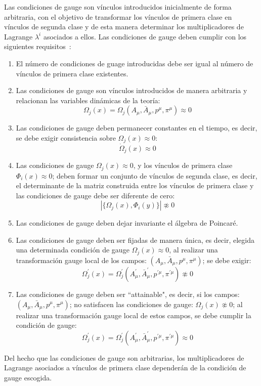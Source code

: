 \documentclass[a4paper,12pt]{article}
\begin{document}
Las condiciones de gauge son vínculos introducidos inicialmente de forma arbitraria, con el objetivo de transformar los vínculos de primera clase en vínculos de segunda clase y de esta manera determinar los multiplicadores de Lagrange $\lambda^i$ asociados a ellos. Las condiciones de gauge deben cumplir con los siguientes \mbox{requisitos \cite{dirac,puebla,Merilin}:}
\begin{enumerate}
\item [\fbox{1.}] El número de condiciones de guage introducidas debe ser igual al número de vínculos de primera clase existentes. 
\item [\fbox{2.}] Las condiciones de gauge son vínculos introducidos de manera arbitraria y relacionan las variables dinámicas de la teoría:
\begin{equation}
\Omega_j(x)=\Omega_j(A_\mu,\bar{A}_\mu,p^\mu,\pi^\mu)\approx0 
\end{equation}
\item [\fbox{3.}] Las condiciones de gauge deben permanecer constantes en el tiempo, es decir, se debe exigir consistencia sobre $\Omega_j(x)\approx0 $:
\begin{equation}
\dot{\Omega}_j(x)\approx0
\end{equation}
\item [\fbox{4.}] Las condiciones de gauge $\Omega_j(x)\approx0 $, y los vínculos de primera \mbox{clase $\Phi_i(x)\approx0$;} deben formar un conjunto de vínculos de segunda clase, es decir, el determinante de la matriz construida entre los vínculos de primera clase y las condiciones de gauge debe ser diferente de cero:
\begin{equation}
|\{\Omega_j(x),\Phi_i(y)\}|\not\approx0  
\end{equation}
\item [\fbox{5.}] Las condiciones de gauge deben dejar invariante el álgebra de Poincaré.
\item [\fbox{6.}] Las condiciones de gauge deben ser fijadas de manera única, es decir, elegida una determinada condición de gauge $\Omega_j(x)\approx0 $, al realizar una transformación gauge local de los campos: $(A_\mu,\bar{A}_\mu,p^\mu,\pi^\mu)$; se debe exigir:
\begin{equation}
\Omega_j^{'}(x)=\Omega_j^{'}(A^{'}_\mu,\bar{A}^{'}_\mu,p^{'\mu},\pi^{'\mu})\not\approx0  
\end{equation}
\item [\fbox{7.}] Las condiciones de gauge deben ser ``attainable", es decir, si los \mbox{campos: $(A_\mu,\bar{A}_\mu,p^\mu,\pi^\mu)$;} no satisfacen las condiciones de gauge: $\Omega_j(x)\not\approx0$; al realizar una transformación gauge local de estos campos, se debe cumplir la condición de gauge: 
\begin{equation}
\Omega_j^{'}(x)=\Omega_j^{'}(A^{'}_\mu,\bar{A}^{'}_\mu,p^{'\mu},\pi^{'\mu})\approx0  
\end{equation}
\end{enumerate}
Del hecho que las condiciones de gauge son arbitrarias, los multiplicadores de Lagrange asociados a vínculos de primera clase dependerán de la condición de gauge escogida. 
\\
\end{document}

